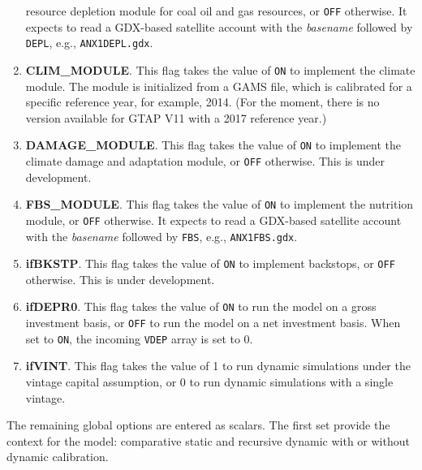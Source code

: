 \begin{enumerate}
   		 resource depletion module for coal
            oil and gas resources, or \texttt{OFF} otherwise. It expects
           to read a GDX-based satellite account with the \emph{basename} followed
           by \texttt{DEPL}, e.g., \texttt{ANX1DEPL.gdx}.
   \item \textbf{CLIM\_MODULE}. This flag takes the value of \texttt{ON} to implement the
   		 climate module. The module is initialized from a
         GAMS file, which is calibrated for a specific reference year, for example,
         2014. (For the moment, there is no version available for GTAP V11 with a 2017 reference year.)
   \item \textbf{DAMAGE\_MODULE}. This flag takes the value of \texttt{ON} to implement the
   		climate damage and adaptation module, or \texttt{OFF} otherwise. This is under development.
   \item \textbf{FBS\_MODULE}. This flag takes the value of \texttt{ON} to implement the
   		 nutrition module, or \texttt{OFF} otherwise. It expects
           to read a GDX-based satellite account with the \emph{basename} followed
           by \texttt{FBS}, e.g., \texttt{ANX1FBS.gdx}.
   \item \textbf{ifBKSTP}. This flag takes the value of \texttt{ON} to implement backstops, or \texttt{OFF} otherwise. This is under development.
   \item \textbf{ifDEPR0}. This flag takes the value of \texttt{ON} to run the
   model on a gross investment basis, or \texttt{OFF} to run the
   model on a net investment basis. When set to \texttt{ON}, the incoming \texttt{VDEP} array is set to 0.
   \item \textbf{ifVINT}. This flag takes the value of 1 to run
   dynamic simulations under the vintage capital assumption, or 0 to run dynamic simulations with a single vintage.
\end{enumerate}

The remaining global options are entered as scalars. The first set provide the
context for the model: comparative static and recursive dynamic with or without
dynamic calibration.

